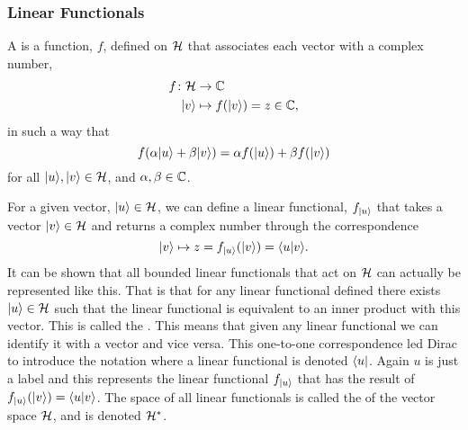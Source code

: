     \subsubsection{Linear Functionals}
    A  is a function, \(f\), defined on \(\mathcal{H}\) that associates each vector with a complex number,
    \begin{align*}
        f\colon\mathcal{H} &\to \mathbb{C}\\
        \vert {v} \rangle &\mapsto f(\vert {v} \rangle) = z\in\mathbb{C},
    \end{align*}
    in such a way that
    \[f(\alpha\vert {u} \rangle + \beta\vert {v} \rangle) = \alpha f(\vert {u} \rangle) + \beta f(\vert {v} \rangle)\]
    for all \(\vert {u} \rangle, \vert {v} \rangle\in\mathcal{H}\), and \(\alpha, \beta\in\mathbb{C}\).
    
    For a given vector, \(\vert {u} \rangle\in\mathcal{H}\), we can define a linear functional, \(f_{\vert {u} \rangle}\) that takes a vector \(\vert {v} \rangle\in\mathcal{H}\) and returns a complex number through the correspondence
    \[\vert {v} \rangle \mapsto z = f_{\vert {u} \rangle}(\vert {v} \rangle) = \langle {u} \vert {v} \rangle.\]
    It can be shown that all bounded linear functionals that act on \(\mathcal{H}\) can actually be represented like this.
    That is that for any linear functional defined there exists \(\vert {u} \rangle\in\mathcal{H}\) such that the linear functional is equivalent to an inner product with this vector.
    This is called the .
    This means that given any linear functional we can identify it with a vector and vice versa.
    This one-to-one correspondence led Dirac to introduce the  notation where a linear functional is denoted \(\langle {u} \vert\).
    Again \(u\) is just a label and this represents the linear functional \(f_{\vert {u} \rangle}\) that has the result of \(f_{\vert {u} \rangle}(\vert {v} \rangle) = \langle {u} \vert {v} \rangle\).
    The space of all linear functionals is called the  of the vector space \(\mathcal{H}\), and is denoted \(\mathcal{H}^*\).
    

